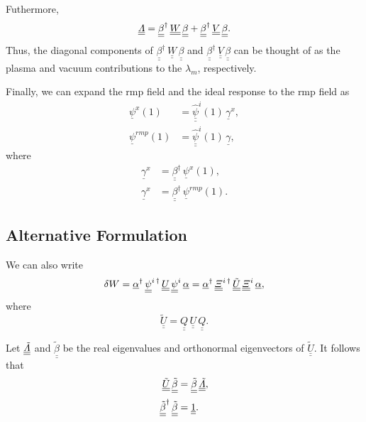 \documentclass[12pt,prb,aps,notitlepage]{revtex4-1}
\begin{document}
 Futhermore,
\begin{equation}
\underline{\underline{{\mit\Lambda}}}=\underline{\underline{\beta}}^\dag\,\underline{\underline{W}}\,\underline{\underline{\beta}}
+\underline{\underline{\beta}}^\dag\,\underline{\underline{V}}\,\underline{\underline{\beta}}.
\end{equation}
Thus, the diagonal components of $\underline{\underline{\beta}}^\dag\,\underline{\underline{W}}\,\underline{\underline{\beta}}$ and 
$\underline{\underline{\beta}}^\dag\,\underline{\underline{V}}\,\underline{\underline{\beta}}$ can be thought of as the
plasma and vacuum contributions to the $\lambda_m$, respectively. 

Finally, we can expand the rmp field and the ideal response to the rmp field as
\begin{align}
\underline{\psi}^x(1) &=\underline{\underline{\hat{\psi}}}^i(1)\,\underline{\gamma}^x,\\[0.5ex]
\underline{\psi}^{rmp}(1) &=\underline{\underline{\hat{\psi}}}^i(1)\,\underline{\gamma},
\end{align}
where 
\begin{align}
\underline{\gamma}^x&= \underline{\underline{\beta}}^\dag\,\underline{\psi}^x(1),\\[0.5ex]
\underline{\gamma}^x&= \underline{\underline{\beta}}^\dag\,\underline{\psi}^{rmp}(1).
\end{align}

\subsection{Alternative Formulation}
We can also write
\begin{equation}
\delta W =   \underline{\alpha}^\dag\,\underline{\underline{\psi}}^{i\,\dag}\,\underline{\underline{U}}\,\underline{\underline{\psi}}^i\,\underline{\alpha}
  = \underline{\alpha}^\dag\,\underline{\underline{\mit\Xi}}^{i\,\dag}\,\underline{\underline{\tilde{U}}}\,\underline{\underline{\mit\Xi}}^i\,\underline{\alpha},
\end{equation}
where
\begin{equation}
\underline{\underline{\tilde{U}}}= \underline{\underline{Q}}\,\underline{\underline{U}}\,\underline{\underline{Q}}.
\end{equation}

Let 
  $\underline{\underline{\tilde{\mit\Lambda}}}$
  and $\underline{\underline{\tilde{\beta}}}$ be the real eigenvalues and orthonormal eigenvectors of $\underline{\underline{\tilde{U}}}$. 
   It follows that 
 \begin{align}
\underline{\underline{\tilde{U}}}\,\underline{\underline{\tilde{\beta}}}&=\underline{\underline{\tilde{\beta}}}\,\underline{\underline{\tilde{\mit\Lambda}}},\\[0.5ex]
\underline{\underline{\tilde{\beta}}}^\dag\,\underline{\underline{\tilde{\beta}}}&= \underline{\underline{1}}.
\end{align}
\end{document}
